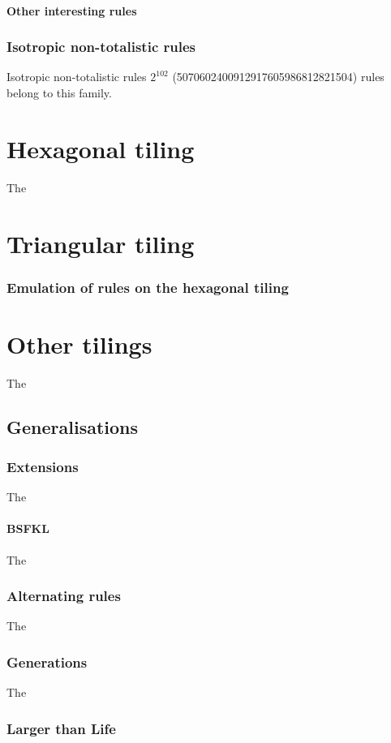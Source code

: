 \documentclass[
	11pt, %
	fleqn, %
	a4paper, %
]{LegrandOrangeBook}
\begin{document}
\subsection{Other interesting rules}
\section{Isotropic non-totalistic rules}
Isotropic non-totalistic rules
$2^{102}$ (5070602400912917605986812821504) rules belong to this family.
\part{Hexagonal tiling}
The
\part{Triangular tiling}
\section{Emulation of rules on the hexagonal tiling}
\part{Other tilings}
The
\chapterspaceabove{6.75cm} %
\chapterspacebelow{7.25cm} %
\chapter{Generalisations}
\section{Extensions}
The
\subsection*{BSFKL}
The
\section{Alternating rules}
The
\section{Generations}
The
\section{Larger than Life}
\end{document}
